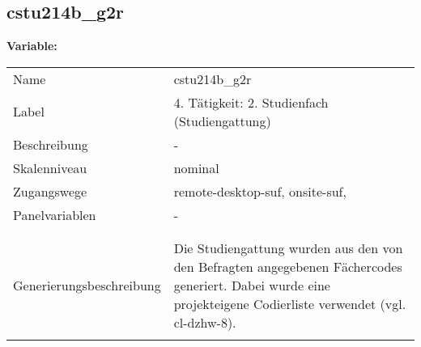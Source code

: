 	
	
	\subsection{cstu214b\_g2r}
	\label{subSection:cstu214b_g2r}

	\noindent\textbf{Variable:}\\
		\begin{tabular}{lL{11.3cm}}
			\label{tableVariable:cstu214b_g2r}
			Name & cstu214b\_g2r \\
			Label & 4. Tätigkeit: 2. Studienfach (Studiengattung) \\
			Beschreibung & - \\
			Skalenniveau & nominal \\
			Zugangswege &
				remote-desktop-suf,
				onsite-suf,
 \\
			Panelvariablen & -
			 \\
			 \\
 \\
					Generierungsbeschreibung & Die Studiengattung wurden aus den von den Befragten angegebenen Fächercodes generiert.  Dabei wurde eine projekteigene Codierliste verwendet (vgl. cl-dzhw-8).
				 \\	
			 \\
		\end{tabular}






